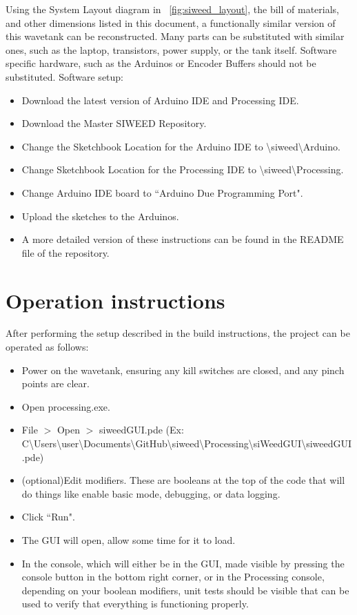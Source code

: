 \documentclass[11pt, letterpaper]{article}
\begin{document}
Using the System Layout diagram in \figurename~\ref{fig:siweed_layout}, the bill of materials, and other dimensions listed in this document, a functionally similar version of this wavetank can be reconstructed.
Many parts can be substituted with similar ones, such as the laptop, transistors, power supply, or the tank itself.
Software specific hardware, such as the Arduinos or Encoder Buffers should not be substituted. 
Software setup:
\begin{itemize}
\item Download the latest version of Arduino IDE and Processing IDE.
\item Download the Master SIWEED Repository.
\item Change the Sketchbook Location for the Arduino IDE to \textbackslash siweed\textbackslash Arduino.
\item Change Sketchbook Location for the Processing IDE to \textbackslash siweed\textbackslash Processing.
\item Change Arduino IDE board to ``Arduino Due Programming Port".
\item Upload the sketches to the Arduinos.
\item A more detailed version of these instructions can be found in the README file of the repository.
\end{itemize}

\section{Operation instructions}

After performing the setup described in the build instructions, the project can be operated as follows:
\begin{itemize}
\item Power on the wavetank, ensuring any kill switches are closed, and any pinch points are clear.
\item Open processing.exe.
\item File $>$ Open $>$ siweedGUI.pde 
(Ex: C\textbackslash Users\textbackslash user\textbackslash Documents\textbackslash GitHub\textbackslash siweed\textbackslash Processing\textbackslash siWeedGUI\textbackslash siweedGUI.pde) 
\item (optional)Edit modifiers. These are booleans at the top of the code that will do things like enable basic mode, debugging, or data logging.
\item Click ``Run".
\item The GUI will open, allow some time for it to load.
\item In the console, which will either be in the GUI, made visible by pressing the console button in the bottom right corner, or in the Processing console, depending on your boolean modifiers, unit tests should be visible that can be used to verify that everything is functioning properly.
\end{itemize}
\end{document}
